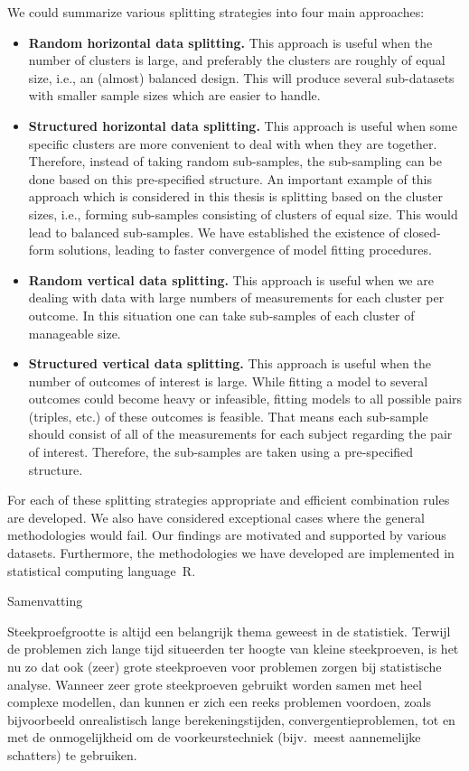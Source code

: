 \documentclass[14pt]{article}
\begin{document}
We could summarize various splitting strategies into four main approaches:
\begin{itemize}
\item \textbf{Random horizontal data splitting.} This approach is useful when the number of clusters is large, and preferably the clusters are roughly of equal size, i.e., an (almost) balanced design. This will produce several sub-datasets with smaller sample sizes which are easier to handle.
\item \textbf{Structured horizontal data splitting.} This approach is useful when some specific clusters are more convenient to deal with when they are together. Therefore, instead of taking random sub-samples, the sub-sampling can be done based on this pre-specified structure. An important example of this approach which is considered in this thesis is splitting based on the cluster sizes, i.e., forming sub-samples consisting of clusters of equal size. This would lead to balanced sub-samples. We have established the existence of closed-form solutions, leading to faster convergence of model fitting procedures.
\item \textbf{Random vertical data splitting.} This approach is useful when we are dealing with data with large numbers of measurements for each cluster per outcome. In this situation one can take sub-samples of each cluster of manageable size. 
\item \textbf{Structured vertical data splitting.} This approach is useful when the number of outcomes of interest is large. While fitting a model to several outcomes could become heavy or infeasible, fitting models to all possible pairs (triples, etc.) of these outcomes is feasible. That means each sub-sample should consist of all of the measurements for each subject regarding the pair of interest. Therefore, the sub-samples are taken using a pre-specified structure.
\end{itemize}

For each of these splitting strategies appropriate and efficient combination rules are developed. We also have considered exceptional cases where the general methodologies would fail. Our findings are motivated and supported by various datasets. Furthermore, the methodologies we have developed are implemented in statistical computing language~R.
\vspace{1cm}


\begin{center}
{\Huge{Samenvatting}}
\end{center}
\vspace{1cm}
\begin{sloppypar}
Steekproefgrootte is altijd een belangrijk thema geweest in de statistiek. Terwijl de problemen zich lange tijd situeerden ter hoogte van kleine steekproeven, is het nu zo dat ook (zeer) grote steekproeven voor problemen zorgen bij statistische analyse. Wanneer zeer grote steekproeven gebruikt worden samen met heel complexe modellen, dan kunnen er zich een reeks problemen voordoen, zoals bijvoorbeeld onrealistisch lange berekeningstijden, convergentieproblemen, tot en met de onmogelijkheid om de voorkeurstechniek (bijv.\ meest aannemelijke schatters) te gebruiken. 
\end{sloppypar}
\end{document}
